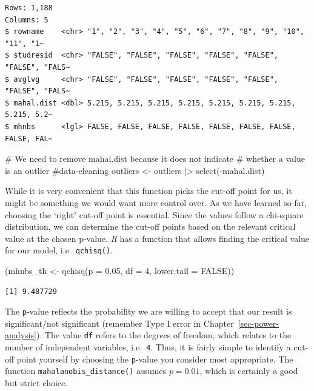 \documentclass[
  letterpaper,
]{krantz}
\makeatletter
\newenvironment{Shaded}{\begin{snugshade}}{\end{snugshade}}
\newcommand{\AttributeTok}[1]{\textcolor[rgb]{0.40,0.45,0.13}{#1}}
\newcommand{\CommentTok}[1]{\textcolor[rgb]{0.37,0.37,0.37}{#1}}
\newcommand{\ConstantTok}[1]{\textcolor[rgb]{0.56,0.35,0.01}{#1}}
\newcommand{\DecValTok}[1]{\textcolor[rgb]{0.68,0.00,0.00}{#1}}
\newcommand{\FloatTok}[1]{\textcolor[rgb]{0.68,0.00,0.00}{#1}}
\newcommand{\FunctionTok}[1]{\textcolor[rgb]{0.28,0.35,0.67}{#1}}
\newcommand{\NormalTok}[1]{\textcolor[rgb]{0.00,0.23,0.31}{#1}}
\newcommand{\OtherTok}[1]{\textcolor[rgb]{0.00,0.23,0.31}{#1}}
\newcommand{\SpecialCharTok}[1]{\textcolor[rgb]{0.37,0.37,0.37}{#1}}
\newenvironment{kframe}{%
\medskip{}
\setlength{\fboxsep}{.8em}
 \def\at@end@of@kframe{}%
 \ifinner\ifhmode%
  \def\at@end@of@kframe{\end{minipage}}%
  \begin{minipage}{\columnwidth}%
 \fi\fi%
 \def\FrameCommand##1{\hskip\@totalleftmargin \hskip-\fboxsep
 \colorbox{shadecolor}{##1}\hskip-\fboxsep
     \hskip-\linewidth \hskip-\@totalleftmargin \hskip\columnwidth}%
 \MakeFramed {\advance\hsize-\width
   \@totalleftmargin\z@ \linewidth\hsize
   \@setminipage}}%
 {\par\unskip\endMakeFramed%
 \at@end@of@kframe}
\renewenvironment{Shaded}{\begin{kframe}}{\end{kframe}}
\makeatother
\begin{document}
\begin{verbatim}
Rows: 1,188
Columns: 5
$ rowname    <chr> "1", "2", "3", "4", "5", "6", "7", "8", "9", "10", "11", "1~
$ studresid  <chr> "FALSE", "FALSE", "FALSE", "FALSE", "FALSE", "FALSE", "FALS~
$ avglvg     <chr> "FALSE", "FALSE", "FALSE", "FALSE", "FALSE", "FALSE", "FALS~
$ mahal.dist <dbl> 5.215, 5.215, 5.215, 5.215, 5.215, 5.215, 5.215, 5.215, 5.2~
$ mhnbs      <lgl> FALSE, FALSE, FALSE, FALSE, FALSE, FALSE, FALSE, FALSE, FAL~
\end{verbatim}

\begin{Shaded}
\begin{Highlighting}[]
\CommentTok{\# We need to remove mahal.dist because it does not indicate}
\CommentTok{\# whether a value is an outlier \#data{-}cleaning}
\NormalTok{outliers }\OtherTok{\textless{}{-}}\NormalTok{ outliers }\SpecialCharTok{|\textgreater{}} \FunctionTok{select}\NormalTok{(}\SpecialCharTok{{-}}\NormalTok{mahal.dist)}
\end{Highlighting}
\end{Shaded}

While it is very convenient that this function picks the cut-off point
for us, it might be something we would want more control over. As we
have learned so far, choosing the `right' cut-off point is essential.
Since the values follow a chi-square distribution, we can determine the
cut-off points based on the relevant critical value at the chosen
p-value. \emph{R} has a function that allows finding the critical value
for our model, i.e.~\texttt{qchisq()}.

\begin{Shaded}
\begin{Highlighting}[]
\NormalTok{(mhnbs\_th }\OtherTok{\textless{}{-}} \FunctionTok{qchisq}\NormalTok{(}\AttributeTok{p =} \FloatTok{0.05}\NormalTok{,}
                   \AttributeTok{df =} \DecValTok{4}\NormalTok{,}
                   \AttributeTok{lower.tail =} \ConstantTok{FALSE}\NormalTok{))}
\end{Highlighting}
\end{Shaded}

\begin{verbatim}
[1] 9.487729
\end{verbatim}

The \texttt{p}-value reflects the probability we are willing to accept
that our result is significant/not significant (remember Type I error in
Chapter~\ref{sec-power-analysis}). The value \texttt{df} refers to the
degrees of freedom, which relates to the number of independent
variables, i.e.~\texttt{4}. Thus, it is fairly simple to identify a
cut-off point yourself by choosing the \texttt{p}-value you consider
most appropriate. The function \texttt{mahalanobis\_distance()} assumes
\(p = 0.01\), which is certainly a good but strict choice.
\end{document}
